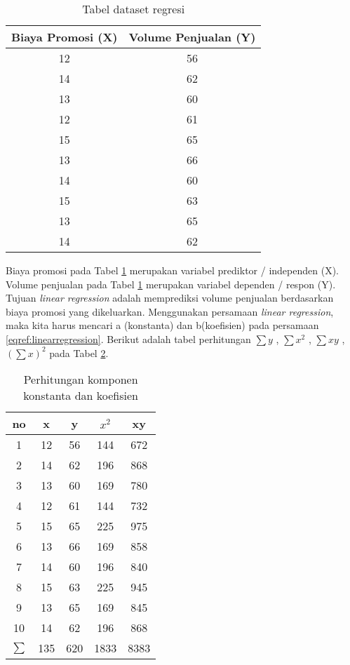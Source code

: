 \begin{table}[H]
\caption{Tabel dataset regresi }
\centering
\begin{tabular}{|c|c|}
\hline 
Biaya Promosi (X) & Volume Penjualan (Y) \\ 
\hline 
12 & 56 \\ 
\hline 
14 & 62 \\ 
\hline 
13 & 60 \\ 
\hline 
12 & 61 \\ 
\hline 
15 & 65 \\ 
\hline 
13 & 66 \\ 
\hline 
14 & 60 \\ 
\hline 
15 & 63 \\ 
\hline 
13 & 65 \\ 
\hline 
14 & 62 \\ 
\hline 
\end{tabular} 
\label{tab:dataset}
\end{table}

Biaya promosi pada Tabel \ref{tab:dataset} merupakan variabel prediktor / independen (X). Volume penjualan pada Tabel \ref{tab:dataset} merupakan variabel dependen / respon (Y). Tujuan \textit{linear regression} adalah memprediksi volume penjualan berdasarkan biaya promosi yang dikeluarkan. Menggunakan persamaan \textit{linear regression}, maka kita harus mencari a (konstanta) dan b(koefisien) pada persamaan \ref{eqref:linearregression}. Berikut adalah tabel perhitungan $\sum y$  , $\sum x^2$ , $\sum xy$ , $(\sum x)^2$ pada Tabel \ref{tab:konstantakoefisienlinear}.

\begin{table}[H]
\caption{ Perhitungan komponen konstanta dan koefisien}
\centering
\begin{tabular}{|c|c|c|c|c|}
\hline 
no & x & y & $x^2$ & xy \\ 
\hline 
1 & 12 & 56 & 144 & 672 \\ 
\hline 
2 & 14 & 62 & 196 & 868 \\ 
\hline 
3 & 13 & 60 & 169 & 780 \\ 
\hline 
4 & 12 & 61 & 144 & 732 \\ 
\hline 
5 & 15 & 65 & 225 & 975 \\ 
\hline 
6 & 13 & 66 & 169 & 858 \\ 
\hline 
7 & 14 & 60 & 196 & 840 \\ 
\hline 
8 & 15 & 63 & 225 & 945 \\ 
\hline 
9 & 13 & 65 & 169 & 845 \\ 
\hline 
10 & 14 & 62 & 196 & 868 \\ 
\hline 
$\sum $ & 135 & 620 & 1833 & 8383 \\ 
\hline 
\end{tabular} 
\label{tab:konstantakoefisienlinear}
\end{table} 

